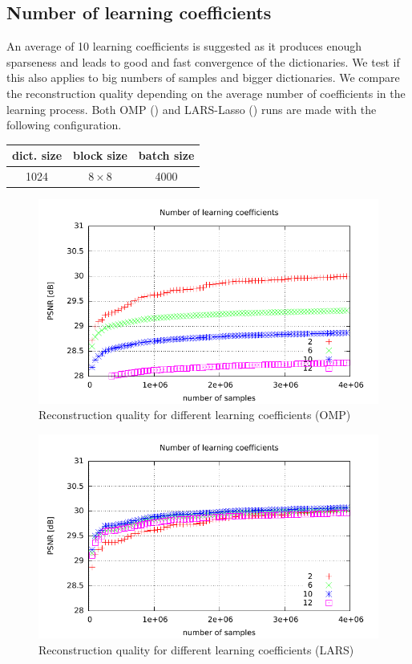 \subsection{Number of learning coefficients}
An average of 10 learning coefficients is suggested as it produces enough
sparseness and leads to good and fast convergence of the dictionaries.
We test if this also applies to big numbers of samples and bigger
dictionaries. We compare the reconstruction quality depending on the average
number of coefficients in the learning process. 
Both OMP () and LARS-Lasso
() runs are made with the following
configuration.
\begin{table}[H]
\centering
\begin{tabular}{| c | c | c |}
\hline
\hline
dict. size & block size & batch size \\
\hline
1024 & $8\times 8$ & 4000  \\
\hline
\end{tabular}
\end{table}
\begin{figure}[H]
\centering
\includegraphics[width =
1.0\textwidth]{../tests/results/coeffsConvergOMP.pdf}
\caption{Reconstruction quality for different learning coefficients (OMP)}
\label{fig:coeffsOMP}
\end{figure}
\begin{figure}[H]
\centering
\includegraphics[width = 1.0\textwidth]{../tests/results/coeffsConverg.pdf}
\caption{Reconstruction quality for different learning coefficients (LARS)}
\label{fig:coeffsLasso}
\end{figure}

